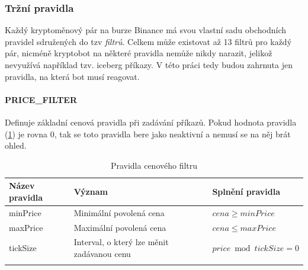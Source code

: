 

\subsubsection{Tržní pravidla}
Každý kryptoměnový pár na burze Binance má svou vlastní sadu obchodních pravidel sdružených do tzv \emph{filtrů}. Celkem může existovat až 13 filtrů pro každý pár, nicméně kryptobot na některé
pravidla nemůže nikdy narazit, jelikož nevyužívá například tzv. iceberg příkazy. V této práci tedy budou zahrnuta jen pravidla, na která bot musí reagovat.


\paragraph*{PRICE\_FILTER}
Definuje základní cenová pravidla při zadávání příkazů. Pokud hodnota pravidla (\ref{tab:binance:price_filter}) je rovna 0, tak se toto pravidla bere jako neaktivní a nemusí se na něj brát ohled.
\begin{center}
    \begin{longtable}[h]{|l|l|l|}
        \hline
        Název pravidla & Význam                                     & Splnění pravidla           \\
        \hline
        minPrice       & Minimální povolená cena                    & $ cena \geq  minPrice $    \\ 
        \hline
        maxPrice       & Maximální povolená cena                    & $ cena \leq maxPrice $     \\ 
        \hline
        tickSize       & Interval, o který lze měnit zadávanou cenu & $price \bmod tickSize = 0$ \\ 
        \hline
        \caption{Pravidla cenového filtru}
        \label{tab:binance:price_filter}
    \end{longtable}
\end{center}

